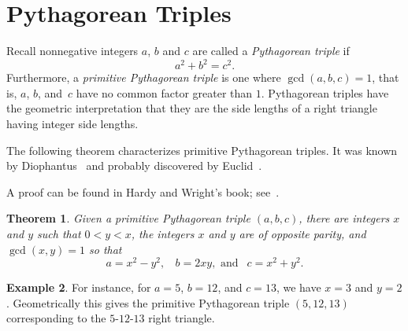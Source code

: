 \documentclass[12pt,table]{article}
\newtheorem{theorem}{Theorem}[section]
\theoremstyle{definition}
\newtheorem{example}[theorem]{Example}
\theoremstyle{remark}
\newcommand{\vanish}[1]{}
\numberwithin{equation}{section}
\begin{document}
\listoftodos


\section{Pythagorean Triples}




Recall nonnegative integers $a$, $b$ and $c$ are called a
{\em Pythagorean triple} if
\[
    a^2 + b^2 = c^2.
\]
Furthermore, a {\em primitive Pythagorean triple}
is one where $\gcd(a,b,c) = 1$, that is,
$a$, $b$, and~$c$ have  no common factor greater than $1$.
Pythagorean triples have the geometric interpretation that
they are the side lengths of a right triangle having integer
side lengths.




The following theorem characterizes primitive Pythagorean triples.
It was known by Diophantus~\cite[Page 93]{Heath} and
probably discovered by Euclid~\cite{Euclid}.




A proof can be found in Hardy and Wright's book; 
see~\cite[XIII, 13.2]{Hardy_and_Wright}.



\vanish{
Also see page 295 of Heath for
Fermat's area of triangle result.}



\begin{theorem}
Given a primitive
Pythagorean triple $(a,b,c)$, there are integers
$x$ and $y$ such that $0 < y < x$, 
the integers
$x$ and $y$ are of opposite parity,
and
$\gcd(x,y) = 1$
so that
\begin{equation}
\label{equation_primitive_Pythagorean_triple}
     a = x^2-y^2, \:\:\:\: 
     b = 2xy, \mbox{  and  } \:\: c=x^2+y^2.
\end{equation}
\end{theorem}


\begin{example}
{\rm
For instance, 
for
$a = 5$, $b = 12$, and $c = 13$,
we have
$x = 3$
and $y = 2$.
Geometrically this gives the primitive Pythagorean triple
$(5, 12, 13)$ corresponding to the 
$5$-$12$-$13$ right triangle. 
}
\end{example}
\end{document}

